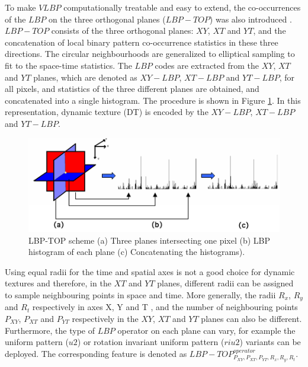 

To make $VLBP$ computationally treatable and easy to extend, the co-occurrences of the $LBP$ on the three orthogonal planes ($LBP-TOP$) was also introduced \cite{zhao2007dynamic}. $LBP-TOP$ consists of the three orthogonal planes: $XY$, $XT$ and $YT$, and the concatenation of local binary pattern co-occurrence statistics in these three directions. The circular neighbourhoods are generalized to elliptical sampling to fit to the space-time statistics. The $LBP$ codes are extracted from the $XY$, $XT$ and $YT$ planes, which are denoted as $XY-LBP$, $XT-LBP$ and $YT-LBP$, for all pixels, and statistics of the three different planes are obtained, and concatenated into a single histogram. The procedure is shown in Figure \ref{fig:LBP-TOP_design}. In this representation, dynamic texture (DT) is encoded by the  $XY-LBP$, $XT-LBP$ and $YT-LBP$.

\begin{figure}[!htb]
\begin{center}
\includegraphics [width=0.75\linewidth] {images/proposed_countermeasure/LBP-TOP_design.png}
\caption[LBP-TOP scheme]{LBP-TOP scheme (a) Three planes intersecting one pixel (b) LBP histogram of each plane (c) Concatenating the histograms).} \label{fig:LBP-TOP_design}
\end{center}
\end{figure}

Using equal radii for the time and spatial axes is not a good choice for dynamic textures \cite{zhao2007dynamic} and therefore, in the $XT$ and $YT$ planes, different radii can be assigned to sample neighbouring points in space and time. More generally, the radii $R_{x}$, $R_{y}$  and $R_{t}$ respectively in axes X, Y and T , and the number of neighbouring points $P_{XY}$, $P_{XT}$ and $P_{YT}$ respectively in the $XY$, $XT$ and $YT$ planes can also be different. Furthermore, the type of $LBP$ operator on each plane can vary, for example the uniform pattern ($u2$) or rotation invariant uniform pattern ($riu2$) variants \cite{inen2011computer} can be deployed. The corresponding feature is denoted as $LBP-TOP_{P_{XY},P_{XT},P_{YT},R_{x},R_{y},R_{t}}^{operator}$.

